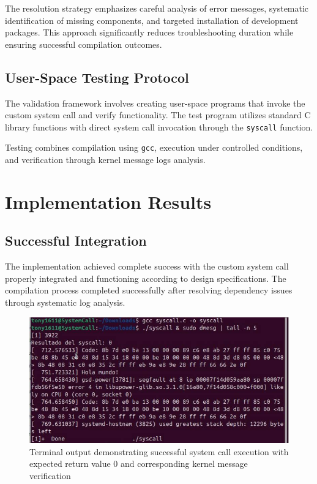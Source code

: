 \documentclass[conference]{IEEEtran}
\begin{document}
The resolution strategy emphasizes careful analysis of error messages, systematic identification of missing components, and targeted installation of development packages. This approach significantly reduces troubleshooting duration while ensuring successful compilation outcomes.

\subsection{User-Space Testing Protocol}

The validation framework involves creating user-space programs that invoke the custom system call and verify functionality. The test program utilizes standard C library functions with direct system call invocation through the \texttt{syscall} function.

Testing combines compilation using \texttt{gcc}, execution under controlled conditions, and verification through kernel message logs analysis.

\section{Implementation Results}

\subsection{Successful Integration}

The implementation achieved complete success with the custom system call properly integrated and functioning according to design specifications. The compilation process completed successfully after resolving dependency issues through systematic log analysis.

\begin{figure}
    \centering
    \includegraphics[width=1\linewidth]{img/resultadosCorrida.png}
    \caption{Terminal output demonstrating successful system call execution with expected return value 0 and corresponding kernel message verification}
    \label{fig:results}
\end{figure}
\end{document}
